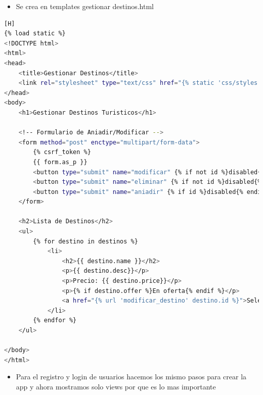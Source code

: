 \documentclass{article}
\begin{document}
	\begin{itemize}
		\item Se crea en templates gestionar destinos.html
	\end{itemize}	
	\begin{lstlisting}[language=bash,caption={Html de gestionar destinos.html}][H]
{% load static %}
<!DOCTYPE html>
<html>
<head>
    <title>Gestionar Destinos</title>
    <link rel="stylesheet" type="text/css" href="{% static 'css/styles.css' %}">
</head>
<body>
    <h1>Gestionar Destinos Turisticos</h1>
    
    <!-- Formulario de Aniadir/Modificar -->
    <form method="post" enctype="multipart/form-data">
        {% csrf_token %}
        {{ form.as_p }}
        <button type="submit" name="modificar" {% if not id %}disabled{% endif %}>Modificar</button>
        <button type="submit" name="eliminar" {% if not id %}disabled{% endif %}>Eliminar</button>
        <button type="submit" name="aniadir" {% if id %}disabled{% endif %}>Anadir</button>
    </form>
    
    <h2>Lista de Destinos</h2>
    <ul>
        {% for destino in destinos %}
            <li>
                <h2>{{ destino.name }}</h2>
                <p>{{ destino.desc}}</p>
                <p>Precio: {{ destino.price}}</p>
                <p>{% if destino.offer %}En oferta{% endif %}</p>
                <a href="{% url 'modificar_destino' destino.id %}">Seleccionar</a>
            </li>
        {% endfor %}
    </ul>
    
</body>
</html>
	\end{lstlisting}
	\begin{itemize}
		\item Para el registro y login de usuarios hacemos los mismo pasos para crear la app y ahora mostramos solo views por que es lo mas importante
	\end{itemize}	
\end{document}
